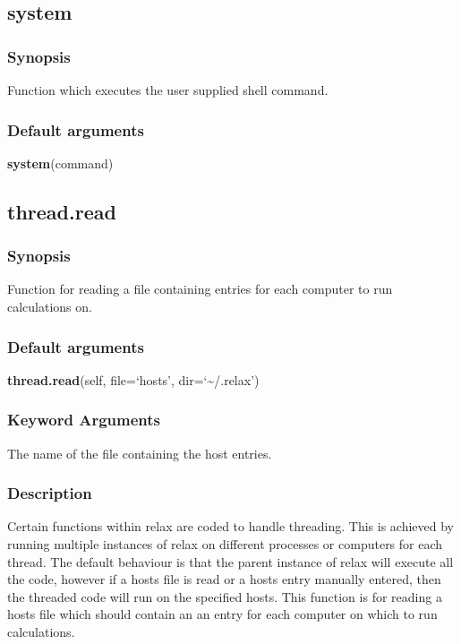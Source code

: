 \newpage

\subsection{system}


\subsubsection{Synopsis}

Function which executes the user supplied shell command.

\subsubsection{Default arguments}

\textsf{\textbf{system}(command)}



\newpage

\subsection{thread.read}


\subsubsection{Synopsis}

Function for reading a file containing entries for each computer to run calculations on.

\subsubsection{Default arguments}

\textsf{\textbf{thread.read}(self, file=`hosts', dir=`\~{}/.relax')}


\subsubsection{Keyword Arguments}

  The name of the file containing the host entries.


\subsubsection{Description}

Certain functions within relax are coded to handle threading.  This is achieved by running
multiple instances of relax on different processes or computers for each thread.  The
default behaviour is that the parent instance of relax will execute all the code, however if
a hosts file is read or a hosts entry manually entered, then the threaded code will run on
the specified hosts.  This function is for reading a hosts file which should contain an
an entry for each computer on which to run calculations.

